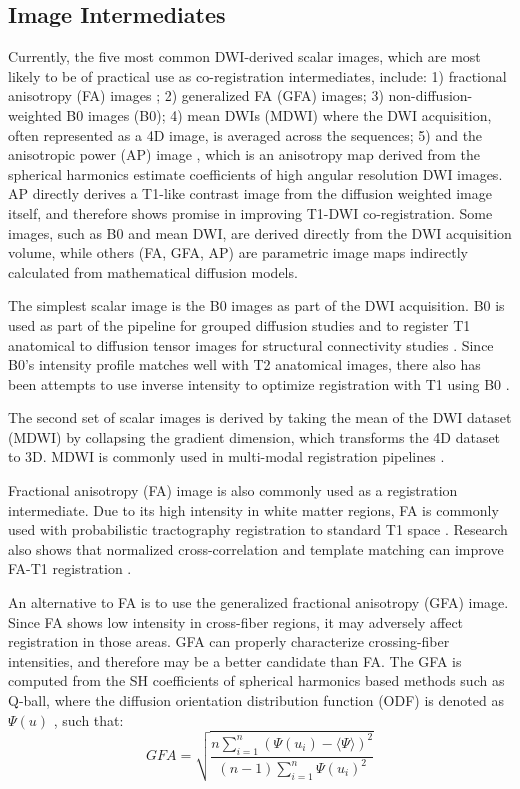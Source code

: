 \subsection{Image Intermediates}
Currently, the five most common DWI-derived scalar images, which are most likely to be of practical use as co-registration intermediates, include: 1) fractional anisotropy (FA) images \cite{Basser2002,Sboto-Frankenstein2013}; 2) generalized FA (GFA)  images; 3) non-diffusion-weighted B0 images (B0); 4) mean DWIs (MDWI) where the DWI acquisition, often represented as a 4D image, is averaged across the sequences;  5) and the anisotropic power (AP) image \cite{DellAcqua2014}, which is an anisotropy map derived from the spherical harmonics estimate coefficients of high angular resolution DWI images. AP directly derives a T1-like contrast image from the diffusion weighted image itself, and therefore shows promise in improving T1-DWI co-registration. Some images, such as B0 and mean DWI, are derived directly from the DWI acquisition volume, while others (FA, GFA, AP) are parametric image maps indirectly calculated from mathematical diffusion models. 

The simplest scalar image is the B0 images as part of the DWI acquisition. B0 is used as part of the pipeline for grouped diffusion studies \cite{Gupta2016,Yeatman2012}and to register T1 anatomical to diffusion tensor images for structural connectivity studies \cite{Cao2013}. Since B0’s intensity profile matches well with T2 anatomical images, there also has been attempts to use inverse intensity to optimize registration with T1 using B0 \cite{Bhushan2015}. 

The second set of scalar images is derived by taking the mean of the DWI dataset (MDWI) by collapsing the gradient dimension, which transforms the 4D dataset to 3D. MDWI is commonly used in multi-modal registration pipelines \cite{Peng2009b}. 

Fractional anisotropy (FA) image \cite{Basser2011c} is also commonly used as a registration intermediate. Due to its high intensity in white matter regions, FA is commonly used with probabilistic tractography registration to standard T1 space \cite{Mansour2013,Salomons2012}. Research also shows that normalized cross-correlation and template matching can improve FA-T1 registration \cite{Malinsky2013}. 

An alternative to FA is to use the generalized fractional anisotropy (GFA) image. Since FA shows low intensity in cross-fiber regions, it may adversely affect registration in those areas. GFA can properly characterize crossing-fiber intensities, and therefore may be a better candidate than FA. The GFA is computed from the SH coefficients of spherical harmonics based methods such as Q-ball, where the diffusion orientation distribution function (ODF) is denoted as  $\Psi(u)$ \cite{Tuch2004}, such that:
\begin{equation}
GFA = \sqrt{\frac{n \sum_{i=1}^{n}( \Psi(u_i) - \langle\Psi\rangle)^2} {(n-1) \sum_{i=1}^{n}\Psi(u_i)^2}}
\end{equation}


